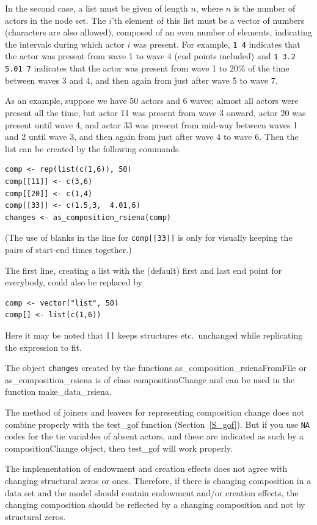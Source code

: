 \documentclass[a4paper,fleqn,11pt]{article}
\newcommand{\+}{\, + \,}
\newcommand{\sfn}[1]{\textsf{#1}}
\begin{document}
In the second case, a list must be given of length $n$,
where $n$ is the number of actors in the node set.
The $i$'th element of this list must be a vector of numbers (characters are also allowed),
composed of an even number of elements, indicating the intervals during
which actor $i$ was present. For example, \texttt{1 4} indicates that the actor
was present from wave 1 to wave 4 (end points included) and
\texttt{1 3.2 5.01 7}
indicates that the actor was present from wave 1 to 20\% of the time between
waves 3 and 4, and then again from just after wave 5 to wave 7.

As an example, suppose we have 50 actors and 6 waves;
almost all actors were present all the time, but actor 11 was present
from wave 3 onward, actor 20 was present until wave 4, and
actor 33 was present from mid-way between waves 1 and 2 until wave 3, and then
again from just after wave 4 to wave 6.
Then the list can be created by the following commands.
\begin{verbatim}
comp <- rep(list(c(1,6)), 50)
comp[[11]] <- c(3,6)
comp[[20]] <- c(1,4)
comp[[33]] <- c(1.5,3,  4.01,6)
changes <- as_composition_rsiena(comp)
\end{verbatim}
(The use of blanks in the line for \texttt{comp[[33]]} is only for visually
keeping the pairs of start-end times together.)

The first line, creating a list with the (default) first and
last end point for everybody, could also be replaced by
\begin{verbatim}
comp <- vector("list", 50)
comp[] <- list(c(1,6))
\end{verbatim}
Here it may be noted that \texttt{[]} keeps structures etc.\ unchanged
while replicating the expression to fit.

The object \texttt{changes} created by the functions
\sfn{as\_composition\_rsienaFromFile} or
\sfn{as\_composition\_rsiena} is of class
\sfn{compositionChange} and can be used in the function
\textsf{make\_data\_rsiena}.

The method of joiners and leavers for representing composition change
does not combine properly with the \textsf{test\_gof} function
(Section~\ref{S_gof}).
But if you use \texttt{NA} codes for the tie variables of absent actors,
and these are indicated as such by a \sfn{compositionChange} object, then
\textsf{test\_gof}  will work properly.

The implementation of endowment and creation effects does not agree
with changing structural zeros or ones. Therefore, if there is
changing composition in a data set and the model should contain endowment
and/or creation effects, the changing composition should be reflected by
a changing composition and not by structural zeros.
\end{document}
